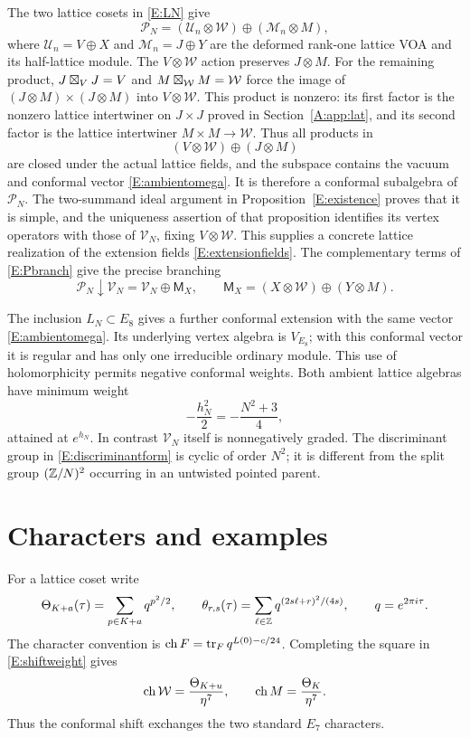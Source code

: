 \documentclass[11pt]{article}
\numberwithin{equation}{section}
\begin{document}
The two lattice cosets in \eqref{E:LN} give
\begin{equation}\label{E:Pbranch}
\mathcal P_N=(\mathcal U_n\otimes \mathcal W)
\oplus(\mathcal M_n\otimes M),
\end{equation}
where $\mathcal U_n=V\oplus X$ and $\mathcal M_n=J\oplus Y$ are the deformed rank-one lattice VOA and its half-lattice module. The $V\otimes\mathcal W$ action preserves $J\otimes M$. For the remaining product, $J\boxtimes_V J=V$ and $M\boxtimes_{\mathcal W}M=\mathcal W$ force the image of $(J\otimes M)\times(J\otimes M)$ into $V\otimes\mathcal W$. This product is nonzero: its first factor is the nonzero lattice intertwiner on $J\times J$ proved in Section~\ref{A:app:lat}, and its second factor is the lattice intertwiner $M\times M\to\mathcal W$. Thus all products in
\[
(V\otimes \mathcal W)\oplus(J\otimes M)
\]
are closed under the actual lattice fields, and the subspace contains the vacuum and conformal vector \eqref{E:ambientomega}. It is therefore a conformal subalgebra of $\mathcal P_N$. The two-summand ideal argument in Proposition~\ref{E:existence} proves that it is simple, and the uniqueness assertion of that proposition identifies its vertex operators with those of $\mathscr{V}_N$, fixing $V\otimes\mathcal W$. This supplies a concrete lattice realization of the extension fields \eqref{E:extensionfields}. The complementary terms of \eqref{E:Pbranch} give the precise branching
\begin{equation}\label{E:parentbranch}
\mathcal P_N\downarrow \mathscr{V}_N=\mathscr{V}_N\oplus\mathsf M_X,
\qquad
\mathsf M_X=(X\otimes \mathcal W)\oplus(Y\otimes M).
\end{equation}

The inclusion $L_N\subset E_8$ gives a further conformal extension with the same vector \eqref{E:ambientomega}. Its underlying vertex algebra is $V_{E_8}$; with this conformal vector it is regular and has only one irreducible ordinary module. This use of holomorphicity permits negative conformal weights. Both ambient lattice algebras have minimum weight
\[
-\frac{h_N^2}{2}=-\frac{N^2+3}{4},
\]
attained at $e^{h_N}$. In contrast $\mathscr{V}_N$ itself is nonnegatively graded. The discriminant group in \eqref{E:discriminantform} is cyclic of order $N^2$; it is different from the split group $(\mathbb Z/N)^2$ occurring in an untwisted pointed parent.

\section{Characters and examples}\label{E:characters}
For a lattice coset write
\[
\Theta_{K+a}(\tau)=\sum_{p\in K+a}q^{p^2/2},\qquad
\theta_{r,s}(\tau)=\sum_{\ell\in\mathbb Z}q^{(2s\ell+r)^2/(4s)},
\qquad q=e^{2\pi i\tau}.
\]
The character convention is $\operatorname{ch} F=\operatorname{tr}_F q^{L(0)-c/24}$. Completing the square in \eqref{E:shiftweight} gives
\begin{equation}\label{E:auxchars}
\operatorname{ch} \mathcal W=\frac{\Theta_{K+u}}{\eta^7},\qquad
\operatorname{ch} M=\frac{\Theta_K}{\eta^7}.
\end{equation}
Thus the conformal shift exchanges the two standard $E_7$ characters.
\end{document}

